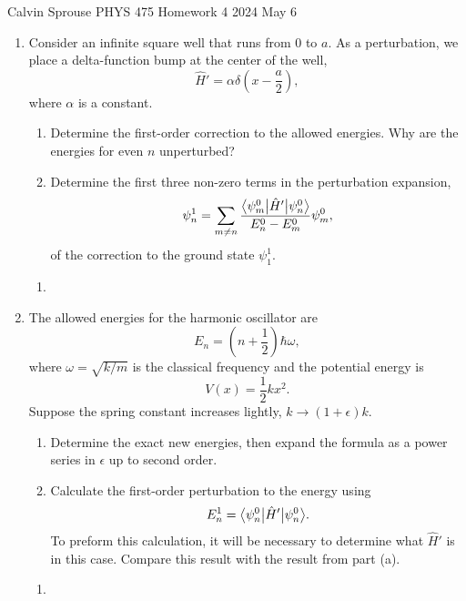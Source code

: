\documentclass[a4paper, 12pt]{config/homework}
\begin{document}
\noindent
\hfill Calvin Sprouse \hfill PHYS 475 Homework 4 \hfill 2024 May 6 \hfill
\bigskip

\begin{enumerate}
\item Consider an infinite square well that runs from 0 to \(a\). As a perturbation, we place a delta-function bump at the center of the well,
\[\hat{H}' = \alpha\delta\left(x-\frac{a}{2}\right),\]
where \(\alpha\) is a constant.
\begin{enumerate}[label=(\alph*)]
\item Determine the first-order correction to the allowed energies. Why are the energies for even \(n\) unperturbed?
\item Determine the first three non-zero terms in the perturbation expansion,
\[\psi^1_n = \sum_{m\ne n}\frac{\bra*{\psi_m^0}\hat{H}'\ket*{\psi_n^0}}{E_n^0-E_m^0}\psi_m^0,\]
of the correction to the ground state \(\psi_1^1\).
\end{enumerate}
\begin{enumerate}[label=(\alph*)]
\item 
\end{enumerate}

\pagebreak
\item The allowed energies for the harmonic oscillator are
\[E_n = \left(n + \frac{1}{2}\right)\hbar\omega,\]
where \(\omega = \sqrt{k/m}\) is the classical frequency and the potential energy is
\[V(x) = \frac{1}{2}kx^2.\]
Suppose the spring constant increases lightly, \(k\to\left(1+\epsilon\right)k\).
\begin{enumerate}[label=(\alph*)]
\item Determine the exact new energies, then expand the formula as a power series in \(\epsilon\) up to second order.
\item Calculate the first-order perturbation to the energy using
\[E_n^1=\bra*{\psi_n^0}\hat{H}'\ket*{\psi_n^0}.\]
To preform this calculation, it will be necessary to determine what \(\hat{H}'\) is in this case. Compare this result with the result from part (a).
\end{enumerate}
\begin{enumerate}[label=(\alph*)]
\item 
\end{enumerate}
\end{enumerate}
\end{document}
